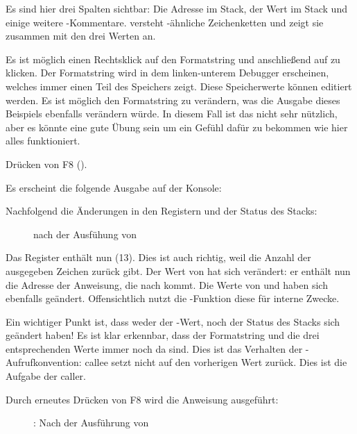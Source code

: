 Es sind hier drei Spalten sichtbar: Die Adresse im Stack, der Wert im Stack und einige weitere \olly-Kommentare.
\olly versteht \printf{}-ähnliche Zeichenketten und zeigt sie zusammen mit den drei  Werten an.

Es ist möglich einen Rechtsklick auf den Formatstring und anschließend auf  zu klicken.
Der Formatstring wird in dem linken-unterem Debugger erscheinen, welches immer einen Teil des Speichers zeigt.
Diese Speicherwerte können editiert werden.
Es ist möglich den Formatstring zu verändern, was die Ausgabe dieses Beispiels ebenfalls verändern würde.
In diesem Fall ist das nicht sehr nützlich, aber es könnte eine gute Übung sein um ein Gefühl dafür zu
bekommen wie hier alles funktioniert.

\clearpage
Drücken von F8 (\stepover).

Es erscheint die folgende Ausgabe auf der Konsole:



Nachfolgend die Änderungen in den Registern und der Status des Stacks:

\begin{figure}[H]
\centering
{}
\caption{\olly nach der Ausfühung von \printf{}}
\label{fig:printf3_olly_3}
\end{figure}

Das Register \EAX enthält nun  (13).
Dies ist auch richtig, weil \printf die Anzahl der ausgegeben Zeichen zurück gibt.
Der Wert von \EIP hat sich verändert: er enthält nun die Adresse der Anweisung, die
nach  kommt.
Die Werte von \ECX und \EDX haben sich ebenfalls geändert.
Offensichtlich nutzt die \printf-Funktion diese für interne Zwecke.

Ein wichtiger Punkt ist, dass weder der \ESP-Wert, noch der Status des Stacks sich geändert haben!
Es ist klar erkennbar, dass der Formatstring und die drei entsprechenden Werte immer noch da sind.
Dies ist das Verhalten der -Aufrufkonvention: \gls{callee} setzt \ESP nicht auf den vorherigen
Wert zurück. Dies ist die Aufgabe der \gls{caller}.

\clearpage
Durch erneutes Drücken von F8 wird die Anweisung  ausgeführt:

\begin{figure}[H]
\centering
{}
\caption{\olly: Nach der Ausführung von }
\label{fig:printf3_olly_4}
\end{figure}

